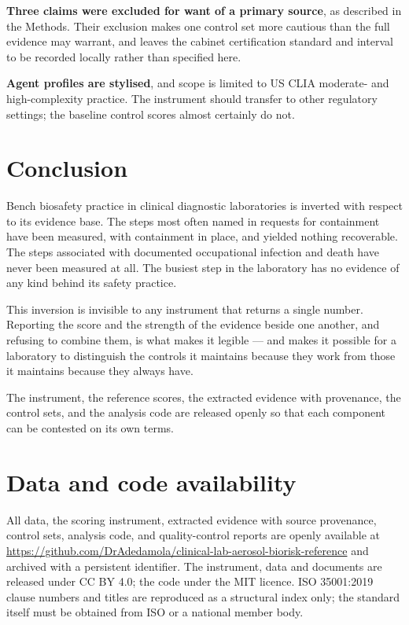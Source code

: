 \textbf{Three claims were excluded for want of a primary source}, as described in the
Methods. Their exclusion makes one control set more cautious than the full evidence may
warrant, and leaves the cabinet certification standard and interval to be recorded
locally rather than specified here.

\textbf{Agent profiles are stylised}, and scope is limited to US CLIA moderate- and
high-complexity practice. The instrument should transfer to other regulatory settings; the
baseline control scores almost certainly do not.

\section{Conclusion}

Bench biosafety practice in clinical diagnostic laboratories is inverted with respect to
its evidence base. The steps most often named in requests for containment have been
measured, with containment in place, and yielded nothing recoverable. The steps associated
with documented occupational infection and death have never been measured at all. The
busiest step in the laboratory has no evidence of any kind behind its safety practice.

This inversion is invisible to any instrument that returns a single number. Reporting the
score and the strength of the evidence beside one another, and refusing to combine them,
is what makes it legible --- and makes it possible for a laboratory to distinguish the
controls it maintains because they work from those it maintains because they always have.

The instrument, the reference scores, the extracted evidence with provenance, the control
sets, and the analysis code are released openly so that each component can be contested on
its own terms.

\section*{Data and code availability}

All data, the scoring instrument, extracted evidence with source provenance, control sets,
analysis code, and quality-control reports are openly available at
\url{https://github.com/DrAdedamola/clinical-lab-aerosol-biorisk-reference} and archived
with a persistent identifier. The instrument, data and documents are released under
CC BY 4.0; the code under the MIT licence. ISO 35001:2019 clause numbers and titles are
reproduced as a structural index only; the standard itself must be obtained from ISO or a
national member body.

